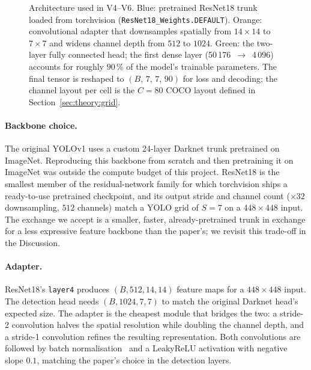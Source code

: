 \begin{figure}[!ht]
\caption{Architecture used in V4--V6. Blue: pretrained ResNet18 trunk loaded
from torchvision (\texttt{ResNet18\_Weights.DEFAULT}). Orange: convolutional
adapter that downsamples spatially from $14\!\times\!14$ to $7\!\times\!7$
and widens channel depth from $512$ to $1024$. Green: the two-layer fully
connected head; the first dense layer (50\,176~$\to$~4\,096) accounts for
roughly $90\,\%$ of the model's trainable parameters. The final tensor is
reshaped to $(B,\,7,\,7,\,90)$ for loss and decoding; the channel layout per
cell is the $C\!=\!80$ COCO layout defined in
Section~\ref{sec:theory:grid}.}
\label{fig:arch}
\end{figure}

\paragraph{Backbone choice.} The original YOLOv1 \citep{redmon2016you} uses a
custom 24-layer Darknet trunk pretrained on ImageNet. Reproducing this
backbone from scratch and then pretraining it on ImageNet was outside the
compute budget of this project. ResNet18 \citep{he2016deep} is the smallest
member of the residual-network family for which torchvision ships a
ready-to-use pretrained checkpoint, and its output stride and channel count
($\times 32$ downsampling, $512$ channels) match a YOLO grid of $S=7$ on a
$448 \times 448$ input. The exchange we accept is a smaller, faster,
already-pretrained trunk in exchange for a less expressive feature backbone
than the paper's; we revisit this trade-off in the Discussion.

\paragraph{Adapter.} ResNet18's \texttt{layer4} produces $(B, 512, 14, 14)$
feature maps for a $448 \times 448$ input. The detection head needs
$(B, 1024, 7, 7)$ to match the original Darknet head's expected size. The
adapter is the cheapest module that bridges the two: a stride-2 convolution
halves the spatial resolution while doubling the channel depth, and a
stride-1 convolution refines the resulting representation. Both convolutions
are followed by batch normalisation~\citep{ioffe2015batch} and a LeakyReLU
activation with negative slope $0.1$, matching the paper's choice in the
detection layers.

